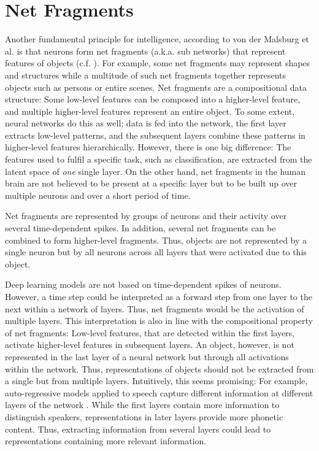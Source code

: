 \section{Net Fragments}
Another fundamental principle for intelligence, according to von der Malsburg et al.  is that neurons form net fragments (a.k.a. sub networks) that represent features of objects (c.f. ).
For example, some net fragments may represent shapes and structures while a multitude of such net fragments together represents objects such as persons or entire scenes.
Net fragments are a compositional data structure: Some low-level features can be composed into a higher-level feature, and multiple higher-level features represent an entire object.
To some extent, neural networks do this as well; data is fed into the network, the first layer extracts low-level patterns, and the subsequent layers combine these patterns in higher-level features hierarchically.
However, there is one big difference: The features used to fulfil a specific task, such as classification, are extracted from the latent space of \emph{one} single layer.
On the other hand, net fragments in the human brain are not believed to be present at a specific layer but to be built up over multiple neurons and over a short period of time.

\begin{claim}
	Net fragments are represented by groups of neurons and their activity over several time-dependent spikes. In addition, several net fragments can be combined to form higher-level fragments. Thus, objects are not represented by a single neuron but by all neurons across all layers that were activated due to this object.
\end{claim}

Deep learning models are not based on time-dependent spikes of neurons.
However, a time step could be interpreted as a forward step from one layer to the next within a network of layers.
Thus, net fragments would be the activation of multiple layers.
This interpretation is also in line with the compositional property of net fragments:
Low-level features, that are detected within the first layers, activate higher-level features in subsequent layers.
An object, however, is not represented in the last layer of a neural network but through all activations within the network.
Thus, representations of objects should not be extracted from a single but from multiple layers.
Intuitively, this seems promising:
For example, auto-regressive models applied to speech capture different information at different layers of the network .
While the first layers contain more information to distinguish speakers, representations in later layers provide more phonetic content.
Thus, extracting information from several layers could lead to representations containing more relevant information.

